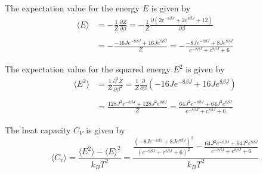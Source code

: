 \documentclass[10pt,a4paper]{article}
\begin{document}
The expectation value for the energy $E$ is given by
\begin{equation}\begin{split}
\langle E \rangle &= -\frac{1}{Z}\frac{\partial Z}{\partial\beta} = -\frac{1}{Z} \frac{\partial (2e^{-8\beta J} + 2e^{8\beta J} + 12)}{\partial \beta}\\\\
&= -\frac{-16Je^{-8\beta J} + 16Je^{8\beta J}}{Z} = -\frac{-8Je^{-8\beta J} + 8Je^{8\beta J}}{e^{-8\beta J} + e^{8\beta J} + 6}
\end{split}\end{equation}

The expectation value for the squared energy $E^2$ is given by
\begin{equation}\begin{split}
\langle E^2 \rangle &= \frac{1}{Z}\frac{\partial^2 Z}{\partial\beta^2} = \frac{1}{Z}\frac{\partial}{\partial\beta}\left(-16Je^{-8\beta J} + 16Je^{8\beta J} \right)\\\\
&= \frac{128J^2e^{-8\beta J} + 128J^2e^{8\beta J}}{Z} = \frac{64J^2e^{-8\beta J} + 64J^2e^{8\beta J}}{e^{-8\beta J}+e^{8\beta J} + 6}
\end{split}\end{equation}


The heat capacity $C_V$ is given by
\begin{equation}
\langle C_v \rangle = \frac{\langle E^2 \rangle - \langle E \rangle ^2}{k_B T^2} = \frac{\frac{\left(-8Je^{-8\beta J} + 8Je^{8\beta J}\right)^2}{\left(e^{-8\beta J} + e^{8\beta J} + 6\right)^2} - \frac{64J^2e^{-8\beta J} + 64J^2e^{8\beta J}}{e^{-8\beta J}+e^{8\beta J} + 6}}{k_B T^2}
\end{equation}
\end{document}
